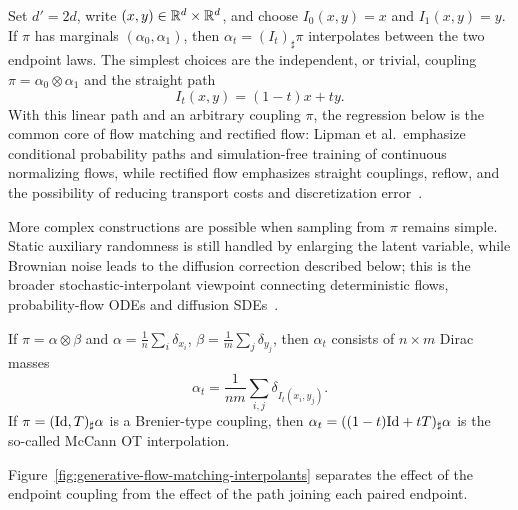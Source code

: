 \begin{example}
	Set $d'=2d$, write $(x,y)\in\mathbb{R}^d\times\mathbb{R}^d$, and choose $I_0(x,y)=x$ and $I_1(x,y)=y$. If $\pi$ has marginals $(\alpha_0,\alpha_1)$, then $\alpha_t=(I_t)_\sharp\pi$ interpolates between the two endpoint laws. The simplest choices are the independent, or trivial, coupling $\pi=\alpha_0\otimes\alpha_1$ and the straight path
	\[
		I_t(x,y)=(1-t)x+ty.
	\]
	With this linear path and an arbitrary coupling $\pi$, the regression below is the common core of flow matching and rectified flow: Lipman et al.\ emphasize conditional probability paths and simulation-free training of continuous normalizing flows, while rectified flow emphasizes straight couplings, reflow, and the possibility of reducing transport costs and discretization error~\cite{Lipman2022FlowMatching,Liu2023RectifiedFlow}.

	More complex constructions are possible when sampling from $\pi$ remains simple. Static auxiliary randomness is still handled by enlarging the latent variable, while Brownian noise leads to the diffusion correction described below; this is the broader stochastic-interpolant viewpoint connecting deterministic flows, probability-flow ODEs and diffusion SDEs~\cite{Albergo2025StochasticInterpolants}.
\end{example}

If $\pi = \alpha \otimes \beta$ and $\alpha = \frac{1}{n} \sum_i \delta_{x_i}$, $\beta = \frac{1}{m} \sum_j \delta_{y_j}$, then $\alpha_t$ consists of $n \times m$ Dirac masses
\begin{equation*}
    \alpha_t = \frac{1}{nm} \sum_{i,j} \delta_{I_t(x_i,y_j)}.
\end{equation*}
If $\pi = (\mathrm{Id}, T)_\sharp \alpha$ is a Brenier-type coupling, then $\alpha_t = ((1-t)\mathrm{Id} + tT)_\sharp \alpha$ is the so-called McCann OT interpolation.

Figure~\ref{fig:generative-flow-matching-interpolants} separates the effect of the endpoint coupling from the effect of the path joining each paired endpoint.

